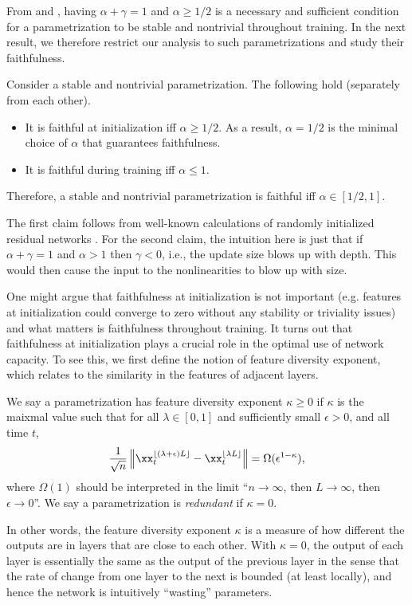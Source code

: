From  and , having $\alpha+\gamma=1$ and $\alpha\ge1/2$ is a necessary and sufficient condition for a parametrization to be stable and nontrivial throughout training. In the next result, we therefore restrict our analysis to such parametrizations and study their faithfulness. 
\begin{claim}\label{clm:faithful}
    Consider a stable and nontrivial parametrization. The following hold (separately from each other).
    \begin{itemize}
        \item It is faithful at initialization iff $\alpha \geq 1/2$. As a result, $\alpha=1/2$ is the minimal choice of $\alpha$ that guarantees faithfulness.
        \item It is faithful during training iff $\alpha \le 1$.
    \end{itemize}
Therefore, a stable and nontrivial parametrization is faithful iff $\alpha \in [1/2,1]$.
\end{claim}
The first claim follows from well-known calculations of randomly initialized residual networks \cite{hayou21stable}.
For the second claim, the intuition here is just that if $\alpha+\gamma=1$ and $\alpha>1$
then $\gamma<0$, i.e., the update size blows up with depth. This
would then cause the input to the nonlinearities to blow up with size.

One might argue that faithfulness at initialization is not important (e.g. features at initialization could converge to zero without any stability or triviality issues) and what matters is faithfulness throughout training. It turns out that faithfulness at initialization plays a crucial role in the optimal use of network capacity. To see this, we first define the notion of feature diversity exponent, which relates to the similarity in the features of adjacent layers.
\begin{defn}
We say a parametrization has feature diversity exponent $\kappa\geq 0$ if $\kappa$ is the maixmal value such that for all $\lambda \in [0, 1]$ and sufficiently small $\epsilon > 0$, and all time $t$, 
\[\frac{1}{\sqrt{n}} \left\| \xx^{\lfloor (\lambda + \epsilon) L \rfloor}_t - \xx_t^{\lfloor \lambda L \rfloor} \right\| = \Omega(\epsilon^{1-\kappa}),\]
where $\Omega(1)$ should be interpreted in the limit ``$n \to \infty$, then $L \to \infty$, then $\epsilon \to 0$''. We say a parametrization is \emph{redundant} if $\kappa=0$.
\end{defn}
In other words, the feature diversity exponent $\kappa$ is a measure of how different the outputs are in layers that are close to each other. With $\kappa=0$, the output of each layer is essentially the same as the output of the previous layer in the sense that the rate of change from one layer to the next is bounded (at least locally), and hence the network is intuitively ``wasting'' parameters.

